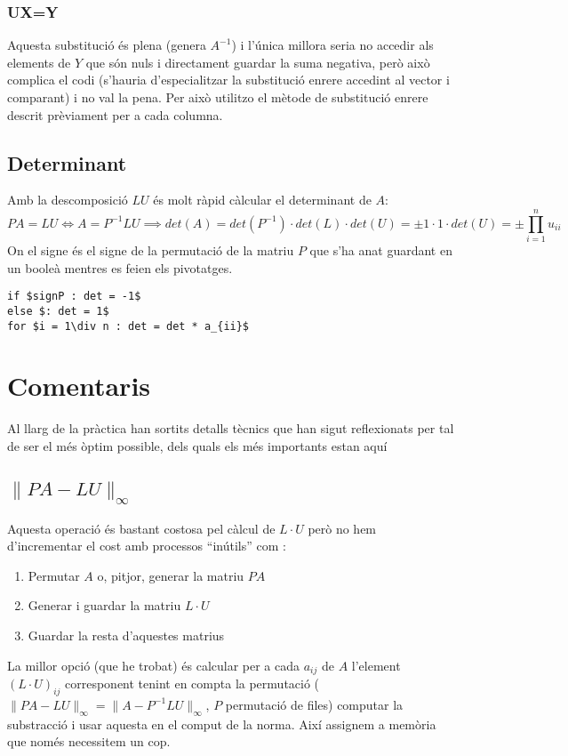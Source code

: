 \documentclass[a4paper,10pt]{article}
\begin{document}
\subsubsection{UX=Y}
Aquesta substitució és plena (genera $A^{-1}$) i l'única millora seria no accedir als elements de $Y$ que són nuls i directament guardar la suma negativa,
però això complica el codi (s'hauria d'especialitzar la substitució enrere accedint al vector i comparant) i no val la pena. Per això utilitzo el
mètode de substitució enrere descrit prèviament per a cada columna.
\subsection{Determinant}
Amb la descomposició $LU$ és molt ràpid càlcular el determinant de $A$:
\begin{equation*}
  PA = LU \iff A = P^{-1}LU \implies det(A) = det(P^{-1})\cdot det(L) \cdot det(U) = \pm1\cdot 1 \cdot det(U) = \pm \prod_{i=1}^nu_{ii}
\end{equation*}
On el signe és el signe de la permutació de la matriu $P$ que s'ha anat guardant en un booleà mentres es feien els pivotatges.
\begin{lstlisting}[mathescape]
if $signP : det = -1$
else $: det = 1$
for $i = 1\div n : det = det * a_{ii}$
\end{lstlisting}
\section{Comentaris}
Al llarg de la pràctica han sortits detalls tècnics que han sigut reflexionats per tal de ser el més òptim possible, dels quals els més importants estan aquí
\subsection{$\|PA-LU\|_\infty$}
Aquesta operació és bastant costosa pel càlcul de $L\cdot U$ però no hem d'incrementar el cost amb processos ``inútils'' com :
\begin{enumerate}
 \item Permutar $A$ o, pitjor, generar la matriu $PA$
 \item Generar i guardar la matriu $L\cdot U$
 \item Guardar la resta d'aquestes matrius
\end{enumerate}
La millor opció (que he trobat) és calcular per a cada $a_{ij}$ de $A$ l'element $(L\cdot U)_{ij}$ corresponent tenint en compta la permutació
($\|PA-LU\|_\infty = \|A-P^{-1}LU\|_\infty$, $P$ permutació de files) computar la substracció i usar aquesta en el comput de la norma.
Així assignem a memòria que només necessitem un cop.
\end{document}

